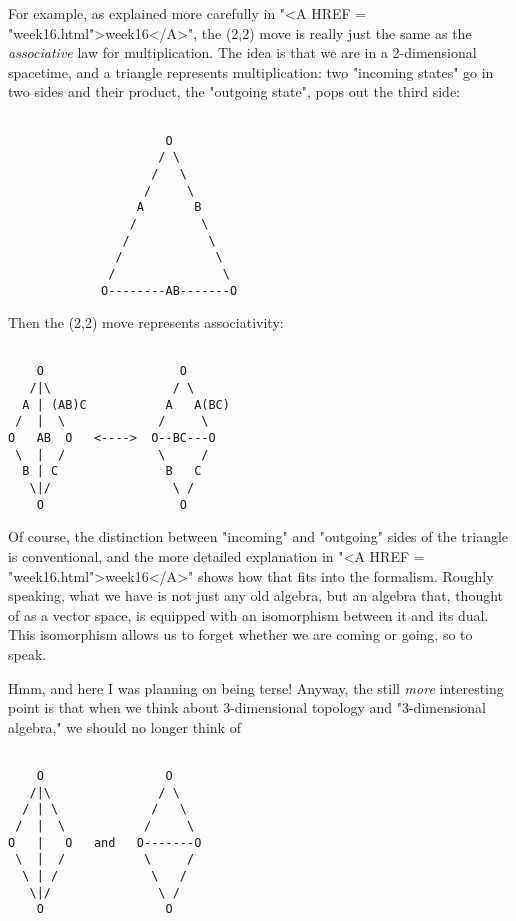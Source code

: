 For example, as explained more carefully 
in "<A HREF = "week16.html">week16</A>", the (2,2) move is
really just the same as the \emph{associative} law for multiplication.  The
idea is that we are in a 2-dimensional spacetime, and a triangle
represents multiplication: two "incoming states" go in two sides and
their product, the "outgoing state", pops out the third side:


\begin{verbatim}

                      O
                     / \
                    /   \
                   /     \
                  A       B
                 /         \
                /           \
               /             \
              /               \
             O--------AB-------O
\end{verbatim}
    

Then the (2,2) move represents associativity:



\begin{verbatim}

    O                   O
   /|\                 / \
  A | (AB)C           A   A(BC)
 /  |  \             /     \
O   AB  O   <---->  O--BC---O
 \  |  /             \     /
  B | C               B   C
   \|/                 \ /
    O                   O
\end{verbatim}
    

Of course, the distinction between "incoming" and "outgoing" sides of
the triangle is conventional, and the more detailed explanation in
"<A HREF = "week16.html">week16</A>" shows how that fits into the formalism.  
Roughly speaking, what
we have is not just any old algebra, but an algebra that, thought of as
a vector space, is equipped with an isomorphism between it and its
dual.   This isomorphism allows us to forget whether we are coming or
going, so to speak.

Hmm, and here I was planning on being terse!  Anyway, the still \emph{more}
interesting point is that when we think about 3-dimensional topology and
"3-dimensional algebra," we should no longer think of 



\begin{verbatim}

    O                 O
   /|\               / \
  / | \             /   \
 /  |  \           /     \
O   |   O   and   O-------O
 \  |  /           \     /
  \ | /             \   /
   \|/               \ /
    O                 O
\end{verbatim}
    

